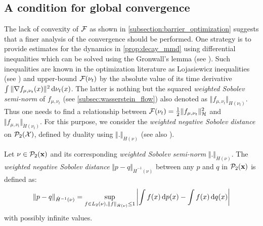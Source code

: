 \subsection{A condition for global convergence}\label{sec:Lojasiewicz_inequality}%
The lack of convexity of ${{\mathcal F}}$ as shown in \cref{subsection:barrier_optimization} suggests that a finer analysis of the convergence should be performed. One strategy is to provide estimates for the dynamics in \cref{prop:decay_mmd} using differential inequalities which can be solved using the Gronwall's lemma (see \cite{oguntuase2001inequality}). Such inequalities  are known in the optimization literature as Lojasiewicz inequalities (see \cite{Bolte:2016}) and upper-bound ${{\mathcal F}}(\nu_t)$ by the absolute value of its time derivative $\int \Vert \nabla f_{\mu,\nu_t}(x) \Vert^2 \mathop{}\!\mathrm{d} \nu_t(x)$.
The latter is nothing but the squared \textit{weighted Sobolev semi-norm} of $f_{\mu,\nu_t}$ (see \cref{subsec:wasserstein_flow}) also denoted as $\Vert f_{\mu,\nu_t} \Vert_{\dot{H}(\nu_t)}$. Thus one needs to find a relationship between ${{\mathcal F}}(\nu_t) = \frac{1}{2} \Vert f_{\mu,\nu_t} \Vert_{\mathcal{H}}^2 $ and $\Vert f_{\mu,\nu_t} \Vert_{\dot{H}(\nu_t)}$. For this purpose, we consider the \textit{weighted negative Sobolev distance} on $\mathcal{P}_2({{\mathcal X}})$, defined by duality using $\Vert . \Vert_{\dot{H}(\nu)}$ (see also \cite{Peyre:2011}).
\begin{definition}\label{def:neg_sobolev}
	Let $\nu\in \mathcal{P}_2({\mathbf x})$ and its corresponding \textit{weighted Sobolev semi-norm} $ \Vert . \Vert_{\dot{H}(\nu)} $. %
	The \textit{weighted negative Sobolev distance} $\Vert p - q \Vert_{\dot{H}^{-1}(\nu)}$ between any $p$ and $q$ in $\mathcal{P}_2({\mathbf x})$  is defined as:
\begin{align}\label{eq:neg_sobolev}
	\Vert p - q \Vert_{\dot{H}^{-1}(\nu)} = \sup_{f\in L_2(\nu), \Vert f \Vert_{\dot{H}(\nu)} \leq 1 } \left\vert \int f(x)\mathop{}\!\mathrm{d} p(x) - \int f(x)\mathop{}\!\mathrm{d} q(x) \right\vert 
\end{align}	
with possibly infinite values.
\end{definition}
